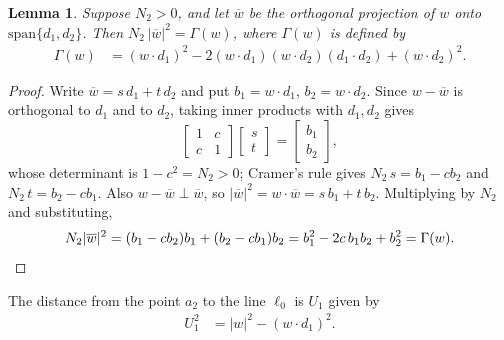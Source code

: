 \documentclass[reqno]{amsart}
\newtheorem{lemma}[theorem]{Lemma}
\theoremstyle{definition}
\begin{document}
\begin{lemma}\label{lem:projQ}
Suppose $N_2>0$, and let $\overline{w}$ be the orthogonal projection of $w$ onto
$\mathrm{span}\{d_1,d_2\}$. Then $N_2\,|\overline{w}|^{2}=\Gamma(w)$, where $\Gamma(w)$ is defined by 
\begin{align}
\Gamma(w)&=(w\cdot d_1)^{2}-2(w\cdot d_1)(w\cdot d_2)(d_1\cdot d_2)+(w\cdot d_2)^{2}. \label{eq:GammaQ}
\end{align}
\end{lemma}
\begin{proof}
Write $\overline{w}=s\,d_1+t\,d_2$ and put $b_1=w\cdot d_1$, $b_2=w\cdot d_2$. Since
$w-\overline{w}$ is orthogonal to $d_1$ and to $d_2$, taking inner products with $d_1,d_2$ gives
\[
\left[
\begin{array}{cc}1&c\\ c&1\end{array}\right]\left[\begin{array}{c}s\\ t\end{array}\right]
=\left[\begin{array}{c}b_1\\ b_2\end{array}\right],
\]
whose determinant is $1-c^{2}=N_2>0$; Cramer's rule gives $N_2\,s=b_1-cb_2$ and
$N_2\,t=b_2-cb_1$. Also $w-\overline{w}\perp \overline{w}$, so
$|\overline{w}|^{2}=w\cdot \overline{w}=s\,b_1+t\,b_2$. Multiplying by $N_2$ and substituting,
\[
N_2|\overline{w}|^{2}=(b_1-cb_2)b_1+(b_2-cb_1)b_2=b_1^{2}-2c\,b_1b_2+b_2^{2}=\Gamma(w). \qedhere
\]
\end{proof}

The distance from the point $a_2$ to the line $\ell_0$ is $U_1$ given by 
\begin{align}
U_1^2&=|w|^{2}-(w\cdot d_1)^{2}. \label{eq:UQ}
\end{align} 
\end{document}
